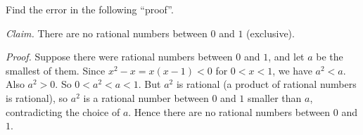 Find the error in the following ``proof''.

\emph{Claim.} There are no rational numbers between $0$ and $1$ (exclusive).

\emph{Proof.} Suppose there were rational numbers between $0$ and $1$, and let $a$ be the smallest of them. Since $x^2-x=x(x-1)<0$ for $0<x<1$, we have $a^2<a$. Also $a^2>0$. So $0<a^2<a<1$. But $a^2$ is rational (a product of rational numbers is rational), so $a^2$ is a rational number between $0$ and $1$ smaller than $a$, contradicting the choice of $a$. Hence there are no rational numbers between $0$ and $1$.
